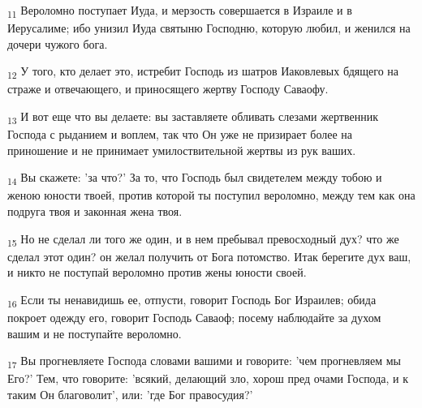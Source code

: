 \begin{tcolorbox}
\textsubscript{11} Вероломно поступает Иуда, и мерзость совершается в Израиле и в Иерусалиме; ибо унизил Иуда святыню Господню, которую любил, и женился на дочери чужого бога.
\end{tcolorbox}
\begin{tcolorbox}
\textsubscript{12} У того, кто делает это, истребит Господь из шатров Иаковлевых бдящего на страже и отвечающего, и приносящего жертву Господу Саваофу.
\end{tcolorbox}
\begin{tcolorbox}
\textsubscript{13} И вот еще что вы делаете: вы заставляете обливать слезами жертвенник Господа с рыданием и воплем, так что Он уже не призирает более на приношение и не принимает умилоствительной жертвы из рук ваших.
\end{tcolorbox}
\begin{tcolorbox}
\textsubscript{14} Вы скажете: 'за что?' За то, что Господь был свидетелем между тобою и женою юности твоей, против которой ты поступил вероломно, между тем как она подруга твоя и законная жена твоя.
\end{tcolorbox}
\begin{tcolorbox}
\textsubscript{15} Но не сделал ли того же один, и в нем пребывал превосходный дух? что же сделал этот один? он желал получить от Бога потомство. Итак берегите дух ваш, и никто не поступай вероломно против жены юности своей.
\end{tcolorbox}
\begin{tcolorbox}
\textsubscript{16} Если ты ненавидишь ее, отпусти, говорит Господь Бог Израилев; обида покроет одежду его, говорит Господь Саваоф; посему наблюдайте за духом вашим и не поступайте вероломно.
\end{tcolorbox}
\begin{tcolorbox}
\textsubscript{17} Вы прогневляете Господа словами вашими и говорите: 'чем прогневляем мы Его?' Тем, что говорите: 'всякий, делающий зло, хорош пред очами Господа, и к таким Он благоволит', или: 'где Бог правосудия?'
\end{tcolorbox}

